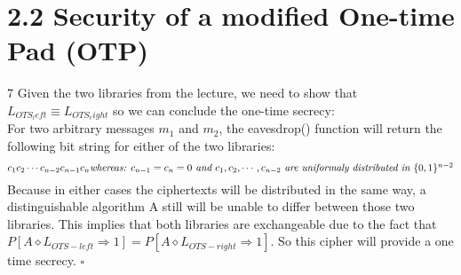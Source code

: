 \documentclass{report}
\begin{document}
	\hfill \\
	
	\section*{2.2 Security of a modified One-time Pad (OTP)}7
	Given the two libraries from the lecture, we need to show that $L_{OTS_left} \equiv L_{OTS_right}$ so we can conclude the one-time secrecy: \\
	For two arbitrary messages $m_1$ and $m_2$, the eavesdrop() function will return the following bit string for either of the two libraries:
	\[
		c_1 c_2 \cdots c_{n-2} c_{n-1} c_n $$ $$
		\textit{whereas: } c_{n - 1} = c_n = 0 \textit{ and } c_1, c_2, \cdots, c_{n-2} \textit{ are uniformaly distributed in } \{0,1\}^{n-2} 
	\]
	Because in either cases the ciphertexts will be distributed in the same way, a distinguishable algorithm A still will be unable to differ between those two libraries. This implies that both libraries are exchangeable due to the fact that $P[A \diamond L_{OTS-left} \Rightarrow 1] = P[A \diamond L_{OTS-right} \Rightarrow 1]$. So this cipher will provide a one time secrecy. $\square$
	\newpage
\end{document}
